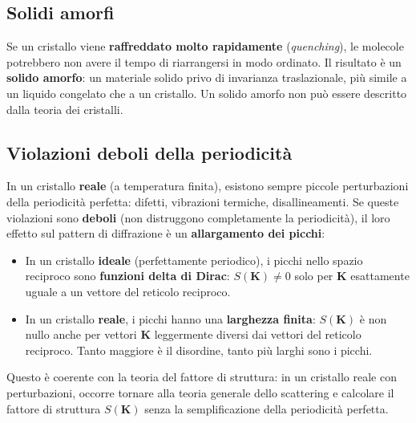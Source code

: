 \subsection*{Solidi amorfi}

Se un cristallo viene \textbf{raffreddato molto rapidamente} (\textit{quenching}), le molecole potrebbero non avere il tempo di riarrangersi in modo ordinato. Il risultato è un \textbf{solido amorfo}: un materiale solido privo di invarianza traslazionale, più simile a un liquido congelato che a un cristallo. Un solido amorfo non può essere descritto dalla teoria dei cristalli.

\subsection*{Violazioni deboli della periodicità}

In un cristallo \textbf{reale} (a temperatura finita), esistono sempre piccole perturbazioni della periodicità perfetta: difetti, vibrazioni termiche, disallineamenti. Se queste violazioni sono \textbf{deboli} (non distruggono completamente la periodicità), il loro effetto sul pattern di diffrazione è un \textbf{allargamento dei picchi}:

\begin{itemize}
    \item In un cristallo \textbf{ideale} (perfettamente periodico), i picchi nello spazio reciproco sono \textbf{funzioni delta di Dirac}: $S(\mathbf{K}) \neq 0$ solo per $\mathbf{K}$ esattamente uguale a un vettore del reticolo reciproco.
    \item In un cristallo \textbf{reale}, i picchi hanno una \textbf{larghezza finita}: $S(\mathbf{K})$ è non nullo anche per vettori $\mathbf{K}$ leggermente diversi dai vettori del reticolo reciproco. Tanto maggiore è il disordine, tanto più larghi sono i picchi.
\end{itemize}

Questo è coerente con la teoria del fattore di struttura: in un cristallo reale con perturbazioni, occorre tornare alla teoria generale dello scattering e calcolare il fattore di struttura $S(\mathbf{K})$ senza la semplificazione della periodicità perfetta.

